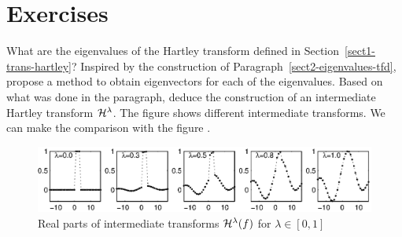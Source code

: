 \section{Exercises}
\label{sect1-ext-trans-fourier-exercises} 
 
 
 
\begin{exo}
\label{exo-eigenvectors-transfo-hartley}
 
  What are the eigenvalues of the Hartley transform defined in Section~\ref{sect1-trans-hartley}? Inspired by the construction of Paragraph~\ref{sect2-eigenvalues-tfd}, propose a method to obtain eigenvectors for each of the eigenvalues. Based on what was done in the paragraph, deduce the construction of an intermediate Hartley transform $ \mathcal{H}^\lambda $. The figure  shows different intermediate transforms. We can make the comparison with the figure . \begin{figure}[ht]
    \begin{center}
    \includegraphics[scale=0.7]{images/transfo-hartley-interm.eps}
    \end{center}
    \caption{Real parts of intermediate transforms $ \mathcal{H}^\lambda (f) $ for $ \lambda \in [0,1] $}
              \label{fig-transfo-hartley-interm}
\end{figure}
\end{exo}
 
